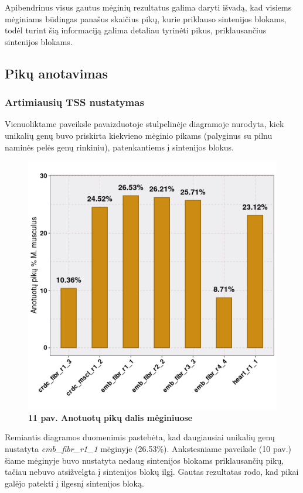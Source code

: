 \documentclass[12pt]{article}
\begin{document}
Apibendrinus visus gautus mėginių rezultatus galima daryti išvadą, kad visiems
mėginiams būdingas panašus skaičius pikų, kurie priklauso sintenijos blokams,
todėl turint šią informaciją galima detaliau tyrinėti pikus, priklausančius
sintenijos blokams.

\subsection{Pikų anotavimas}
\subsubsection{Artimiausių TSS nustatymas}
Vienuoliktame paveiksle pavaizduotoje stulpelinėje diagramoje nurodyta, kiek
unikalių genų buvo priskirta kiekvieno mėginio pikams (palyginus su pilnu
naminės pelės genų rinkiniu), patenkantiems į sintenijos blokus.

\begin{figure}[htb]
    \begin{center}
        \includegraphics[width=0.7\linewidth]{../Figures/Unique_genes_MM.png}
        \vspace{-2\baselineskip}
        \caption*{\small\textbf{11 pav. Anotuotų pikų dalis mėginiuose}}
        \label{fig:11}
    \end{center}
\end{figure}

Remiantis diagramos duomenimis pastebėta, kad daugiausiai unikalių genų
nustatyta \emph{emb\_\-fibr\_r1\_1} mėginyje (26.53\%). Ankstesniame paveiksle
(10 pav.) šiame mėginyje buvo nustatyta nedaug sintenijos blokams priklausančių
pikų, tačiau nebuvo atsižvelgta į sintenijos blokų ilgį. Gautas rezultatas rodo,
kad pikai galėjo patekti į ilgesnį sintenijos bloką.
\end{document}
